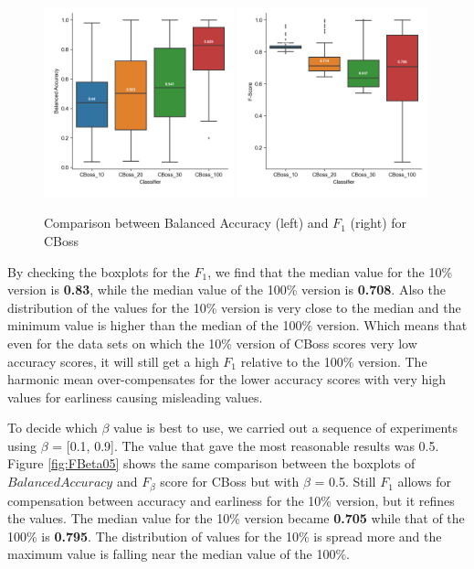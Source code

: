 \begin{figure}[!htbp]
  \captionsetup{justification=raggedright}
  \includegraphics[width=0.49\textwidth,keepaspectratio]{boxplot_accuracy_CBoss.png}
  \includegraphics[width=0.49\textwidth,keepaspectratio]{boxplot_f_score_1_CBoss.png}
  \caption{Comparison between Balanced Accuracy (left) and $F_{1}$ (right) for CBoss}
  \label{fig:FBeta1}
\end{figure}

By checking the boxplots for the $F_{1}$, we find that the median value for the 10\% version is \textbf{0.83}, while the median value of the 100\% version is \textbf{0.708}.
Also the distribution of the values for the 10\% version is very close to the median and the minimum value is higher than the median of the 100\% version.
Which means that even for the data sets on which the 10\% version of CBoss scores very low accuracy scores, it will still get a high $F_{1}$ relative to the 100\% version.
The harmonic mean over-compensates for the lower accuracy scores with very high values for earliness causing misleading values.

To decide which $\beta$ value is best to use, we carried out a sequence of experiments using $\beta$ = [0.1, 0.9].
The value that gave the most reasonable results was 0.5.
Figure \ref{fig:FBeta05} shows the same comparison between the boxplots of $Balanced Accuracy$ and $F_{\beta}$ score for CBoss but with $\beta$ = 0.5.
Still $F_{1}$ allows for compensation between accuracy and earliness for the 10\% version, but it refines the values.
The median value for the 10\% version became \textbf{0.705} while that of the 100\% is \textbf{0.795}.
The distribution of values for the 10\% is spread more and the maximum value is falling near the median value of the 100\%.

